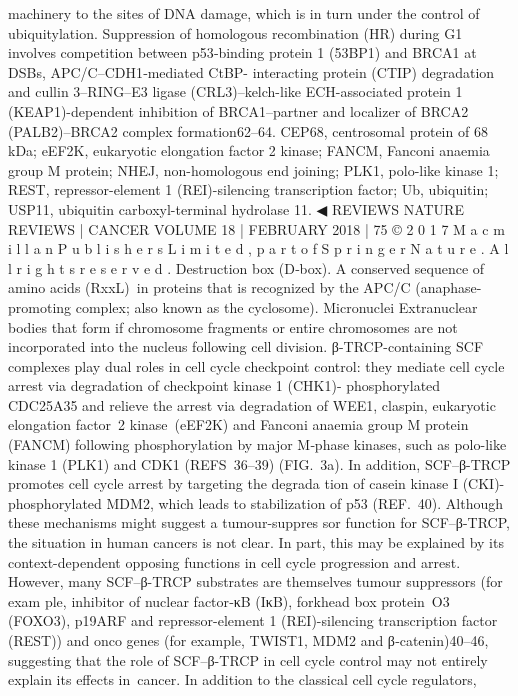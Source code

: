 machinery to the sites of DNA damage, which is in turn under the control of ubiquitylation.
Suppression of homologous recombination (HR) during G1 involves competition between
p53‑binding protein 1 (53BP1) and BRCA1 at DSBs, APC/C–CDH1‑mediated CtBP-
interacting protein (CTIP) degradation and cullin 3–RING–E3 ligase (CRL3)–kelch-like
ECH-associated protein 1 (KEAP1)-dependent inhibition of BRCA1–partner and localizer
of BRCA2 (PALB2)–BRCA2 complex formation62–64. CEP68, centrosomal protein of 68 kDa;
eEF2K, eukaryotic elongation factor 2 kinase; FANCM, Fanconi anaemia group M protein;
NHEJ, non-homologous end joining; PLK1, polo-like kinase 1; REST, repressor-element 1
(REI)-silencing transcription factor; Ub, ubiquitin; USP11, ubiquitin carboxyl-terminal
hydrolase 11.
◀
REVIEWS
NATURE REVIEWS | CANCER
 VOLUME 18 | FEBRUARY 2018 | 75
©
 2
0
1
7
 M
a
c
m
i
l
l
a
n
 P
u
b
l
i
s
h
e
r
s
 L
i
m
i
t
e
d
,
 p
a
r
t
 o
f
 S
p
r
i
n
g
e
r
 N
a
t
u
r
e
.
 A
l
l
 r
i
g
h
t
s
 r
e
s
e
r
v
e
d
.
Destruction box
(D‑box). A conserved sequence
of amino acids (RxxL) in
proteins that is recognized by
the APC/C (anaphase-
promoting complex; also
known as the cyclosome).
Micronuclei
Extranuclear bodies that form
if chromosome fragments or
entire chromosomes are not
incorporated into the nucleus
following cell division.
β-TRCP-containing SCF complexes play dual roles
in cell cycle checkpoint control: they mediate cell cycle
arrest via degradation of checkpoint kinase 1 (CHK1)-
phosphorylated CDC25A35 and relieve the arrest via
degradation of WEE1, claspin, eukaryotic elongation
factor 2 kinase (eEF2K) and Fanconi anaemia group M
protein (FANCM) following phosphorylation by major
M‑phase kinases, such as polo-like kinase 1 (PLK1) and
CDK1 (REFS 36–39) (FIG. 3a). In addition, SCF–β-TRCP
promotes cell cycle arrest by targeting the degrada­
tion of casein kinase I (CKI)-phosphorylated MDM2,
which leads to stabilization of p53 (REF. 40). Although
these mechanisms might suggest a tumour-suppres­
sor function for SCF–β-TRCP, the situation in human
cancers is not clear. In part, this may be explained by
its context-dependent opposing functions in cell cycle
progression and arrest. However, many SCF–β-TRCP
substrates are themselves tumour suppressors (for exam­
ple, inhibitor of nuclear factor‑κB (IκB), forkhead box
protein O3 (FOXO3), p19ARF and repressor-element 1
(REI)-silencing transcription factor (REST)) and onco­
genes (for example, TWIST1, MDM2 and β‑catenin)40–46,
suggesting that the role of SCF–β-TRCP in cell cycle
control may not entirely explain its effects in cancer.
In addition to the classical cell cycle regulators,

